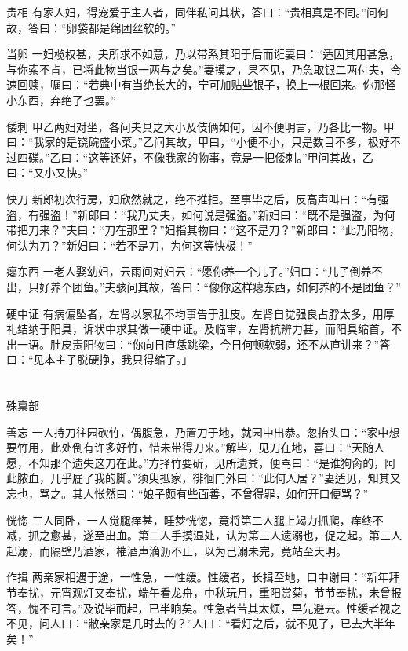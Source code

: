 \documentclass[12pt,UTF8]{ctexbook}
\begin{document}
贵相
有家人妇，得宠爱于主人者，同伴私问其状，答曰：“贵相真是不同。”问何故，答曰：“卵袋都是绵团丝软的。”

当卵
一妇榄权甚，夫所求不如意，乃以带系其阳于后而诳妻曰：“适因其用甚急，与你索不肯，已将此物当银一两与之矣。”妻摸之，果不见，乃急取银二两付夫，令速回赎，嘱曰：“若典中有当绝长大的，宁可加贴些银子，换上一根回来。你那怪小东西，弃绝了也罢。”

倭刺
甲乙两妇对坐，各问夫具之大小及伎俩如何，因不便明言，乃各比一物。甲曰：“我家的是铙碗盛小菜。”乙问其故，甲曰，“小便不小，只是数目不多，极好不过四碟。”乙曰：“这等还好，不像我家的物事，竟是一把倭刺。”甲问其故，乙曰：“又小又快。”

快刀
新郎初次行房，妇欣然就之，绝不推拒。至事毕之后，反高声叫曰：“有强盗，有强盗！”新郎曰：“我乃丈夫，如何说是强盗。”新妇曰：“既不是强盗，为何带把刀来？”夫曰：“刀在那里？”妇指其物曰：“这不是刀？”新郎曰：“此乃阳物，何认为刀？”新妇曰：“若不是刀，为何这等快极！”

瘪东西
一老人娶幼妇，云雨间对妇云：“愿你养一个儿子。”妇曰：“儿子倒养不出，只好养个团鱼。”夫骇问其故，答曰：“像你这样瘪东西，如何养的不是团鱼？”

硬中证
有病偏坠者，左肾以家私不均事告于肚皮。左肾自觉强良占脬太多，用厚礼结纳于阳具，诉状中求其做一硬中证。及临审，左肾抗辨力甚，而阳具缩首，不出一语。肚皮责阳物曰：“你向日直恁跳梁，今日何顿软弱，还不从直讲来？”答曰：“见本主子脱硬挣，我只得缩了。」

\part{}

殊禀部

善忘
一人持刀往园砍竹，偶腹急，乃置刀于地，就园中出恭。忽抬头曰：“家中想要竹用，此处倒有许多好竹，惜未带得刀来。”解毕，见刀在地，喜曰：“天随人愿，不知那个遗失这刀在此。”方择竹要斫，见所遗粪，便骂曰：“是谁狗肏的，阿此脓血，几乎屣了我的脚。”须臾抵家，徘徊门外曰：“此何人居？”妻适见，知其又忘也，骂之。其人怅然曰：“娘子颇有些面善，不曾得罪，如何开口便骂？”

恍惚
三人同卧，一人觉腿痒甚，睡梦恍惚，竟将第二人腿上竭力抓爬，痒终不减，抓之愈甚，遂至出血。第二人手摸湿处，认为第三人遗溺也，促之起。第三人起溺，而隔壁乃酒家，槯酒声滴沥不止，以为己溺未完，竟站至天明。

作揖
两亲家相遇于途，一性急，一性缓。性缓者，长揖至地，口中谢曰：“新年拜节奉扰，元宵观灯又奉扰，端午看龙舟，中秋玩月，重阳赏菊，节节奉扰，未曾报答，愧不可言。”及说毕而起，已半晌矣。性急者苦其太烦，早先避去。性缓者视之不见，问人曰：“敝亲家是几时去的？”人曰：“看灯之后，就不见了，已去大半年矣！”
\end{document}
